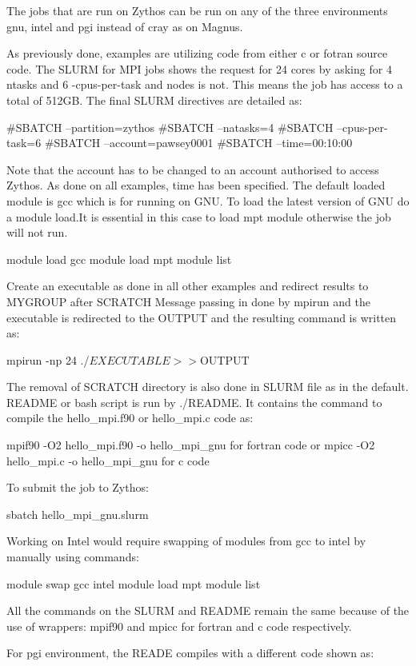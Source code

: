 \begin{Document}
The jobs that are run on Zythos can be run on any of the three environments gnu, intel and pgi instead of cray as on Magnus.




As previously done, examples are utilizing code from either c or fotran source code.
The SLURM for MPI jobs shows the request for 24 cores by asking for 4 ntasks and 6 -cpus-per-task and nodes is not. 
This means the job has access to a total of 512GB.
The final SLURM directives are detailed as:

#SBATCH --partition=zythos
#SBATCH --natasks=4
#SBATCH --cpus-per-task=6
#SBATCH --account=pawsey0001
#SBATCH --time=00:10:00

Note that the account has to be changed to an account authorised to access Zythos.
As done on all examples, time has been specified.
The default loaded module is gcc which is for running on GNU.
To load the latest version of GNU do a module load.It is essential in this case to load mpt module otherwise the job will not run.

module load gcc
module load mpt
module list

Create an executable as done in all other examples and redirect results to MYGROUP after SCRATCH
Message passing in done by mpirun and the executable is redirected to the OUTPUT and the resulting command is written as:

mpirun -np 24 ./$EXECUTABLE >> ${OUTPUT}

The removal of SCRATCH directory is also done in SLURM file as in the default.
README or bash script is run by ./README.
It contains the command to compile the hello_mpi.f90 or hello_mpi.c code as:

mpif90 -O2 hello_mpi.f90 -o hello_mpi_gnu for fortran code or
mpicc -O2 hello_mpi.c -o hello_mpi_gnu for c code

To submit the job to Zythos:

sbatch hello_mpi_gnu.slurm

Working on Intel would require swapping of modules from gcc to intel by manually using commands:

module swap gcc intel
module load mpt
module list

All the commands on the SLURM and README remain the same because of the use of wrappers: mpif90 and mpicc for fortran and c code respectively.

For pgi environment, the READE compiles with a different code shown as:


\end{Document}
